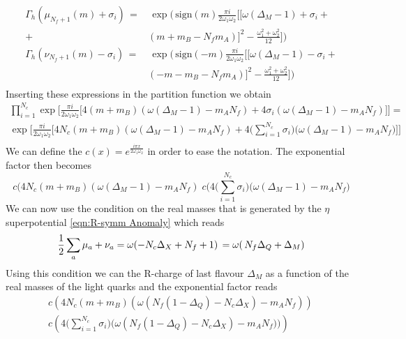 \begin{equation}
\begin{aligned}
\Gamma_h (  \mu_{N_f+1}(m) + \sigma_i ) \, = &\, \exp \bigg( \, \mbox{sign}(m) \frac{\pi i}{2 \omega_1 \omega_2 } \big[ [ \omega (\Delta_M - 1) + \sigma_i + \\
+ & ( m + m_B - N_f m_A)]^2 - \frac{ \omega_1^2 + \omega_2^2 }{12} \big] \bigg )\\
\Gamma_h (  \nu_{N_f+1}(m) - \sigma_i  ) \, = &\, \exp \bigg( \, \mbox{sign}(-m) \frac{\pi i}{2 \omega_1 \omega_2 } \big[ [ \omega (\Delta_M - 1) - \sigma_i + \\
&( - m - m_B - N_f m_A)]^2 - \frac{ \omega_1^2 + \omega_2^2 }{12} \big] \bigg )\\
\end{aligned}
\end{equation}
Inserting these expressions in the partition function we obtain 
\begin{multline}
 \prod_{i=1}^{N_c} \exp \bigg[ \frac{\pi i}{2 \omega_1 \omega_2 } \bigg[ 4  ( m  + m_B ) ( \omega (\Delta_M - 1) -  m_A N_f ) +  4 \sigma_i  (\omega (\Delta_M - 1) -  m_A N_f)\bigg] \bigg] = \\
 \exp \bigg[ \frac{\pi i}{2 \omega_1 \omega_2 } \bigg[ 4 N_c  ( m  + m_B ) ( \omega (\Delta_M - 1) -  m_A N_f ) 
 +4\big( \sum_{i=1}^{N_c}  \sigma_i  \big) \big(\omega (\Delta_M - 1) -  m_A N_f \big)  \bigg] \bigg] \\
\end{multline}
We can define the $ c(x) = e^{ \frac{i \pi x }{2 \omega_1 \omega_2}}$ in order to ease the notation.
The exponential factor then becomes
\begin{equation}
c( 4 N_c  ( m  + m_B ) ( \omega (\Delta_M - 1) -  m_A N_f ) \;  c ( 4\big( \sum_{i=1}^{N_c}  \sigma_i  \big) \big (\omega (\Delta_M - 1) -  m_A N_f \big)
\end{equation}
We can now use the condition on the real masses that is generated by the $\eta$ superpotential \eqref{eqn:R-symm Anomaly} which reads
\begin{equation}
  { 1 \over 2 } \sum_a \mu_a + \nu_a  = \omega ( -N_c \Delta_X + N_f + 1 )  \, =\omega( \, N_f \Delta_Q +  \Delta_M )
\end{equation}
Using this condition we can the R-charge of last flavour $\Delta_M$ as a function of the real masses of the light quarks and the exponential factor reads
\begin{multline}
c \left( 4 N_c  ( m  + m_B ) ( \omega ( N_f (1 - \Delta_Q)  - N_c \Delta_X ) -  m_A N_f )\right)\,  \\
c\left( 4\big( \sum_{i=1}^{N_c}   \sigma_i  \big) \big ( \omega( N_f (1 - \Delta_Q)  - N_c \Delta_X)  -  m_A N_f ) \big) \right)\\
\end{multline}
